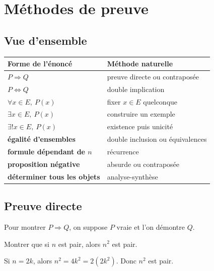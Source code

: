 \documentclass[11pt,a4paper]{article}
\newcommand{\imp}{\Rightarrow}
\newcommand{\ssi}{\Longleftrightarrow}
\begin{document}
\section{Méthodes de preuve}

\subsection{Vue d'ensemble}

\begin{methodebox}
\begin{tabularx}{\textwidth}{|>{\bfseries}l|X|}
\hline
Forme de l'énoncé & Méthode naturelle\\
\hline
\(P\imp Q\) & preuve directe ou contraposée\\
\hline
\(P\ssi Q\) & double implication\\
\hline
\(\forall x\in E,\ P(x)\) & fixer \(x\in E\) quelconque\\
\hline
\(\exists x\in E,\ P(x)\) & construire un exemple\\
\hline
\(\exists!x\in E,\ P(x)\) & existence puis unicité\\
\hline
égalité d'ensembles & double inclusion ou équivalences\\
\hline
formule dépendant de \(n\) & récurrence\\
\hline
proposition négative & absurde ou contraposée\\
\hline
déterminer tous les objets & analyse-synthèse\\
\hline
\end{tabularx}
\end{methodebox}

\subsection{Preuve directe}

\begin{methodebox}
Pour montrer \(P\imp Q\), on suppose \(P\) vraie et l'on démontre \(Q\).
\end{methodebox}

\begin{exemplebox}
Montrer que si \(n\) est pair, alors \(n^2\) est pair.

Si \(n=2k\), alors \(n^2=4k^2=2(2k^2)\). Donc \(n^2\) est pair.
\end{exemplebox}
\end{document}
